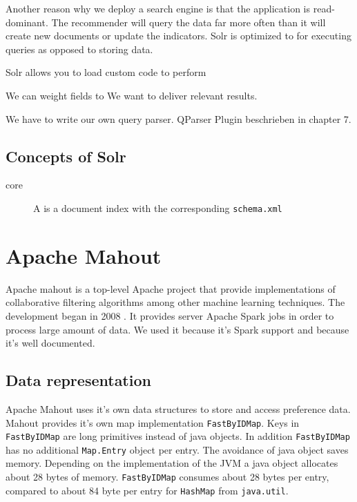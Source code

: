 Another reason why we deploy a search engine is that the application is read-dominant. The recommender will query the data far more often than it will create new documents or update the indicators. Solr is optimized to for executing queries as opposed to storing data.

Solr allows you to load custom code to perform 

We can weight fields to 
We want to deliver relevant results.

We have to write our own query parser.
QParser Plugin beschrieben in chapter 7.

\subsection{Concepts of Solr}
\label{sec:solrconcepts}

\begin{description}
\item[core] A is a document index with the corresponding \verb|schema.xml|
\end{description}

\section{Apache Mahout}
\label{sec:mahout}

Apache mahout is a top-level Apache project that provide implementations of collaborative filtering algorithms among other machine learning techniques. The development began in 2008 \cite{Owen}. It provides server Apache Spark jobs in order to process large amount of data. We used it because it's Spark support and because it's well documented.

\subsection{Data representation}
\label{sec:datarepresentation}

Apache Mahout uses it's own data structures to store and access preference data. Mahout provides it's own map implementation \verb|FastByIDMap|. Keys in \verb|FastByIDMap| are long primitives instead of java objects. In addition \verb|FastByIDMap| has no additional \verb|Map.Entry| object per entry. The avoidance of java object saves memory. Depending on the implementation of the JVM a java object allocates about 28 bytes of memory. \verb|FastByIDMap| consumes about 28 bytes per entry, compared to about 84 byte per entry for \verb|HashMap| from \verb|java.util|.

